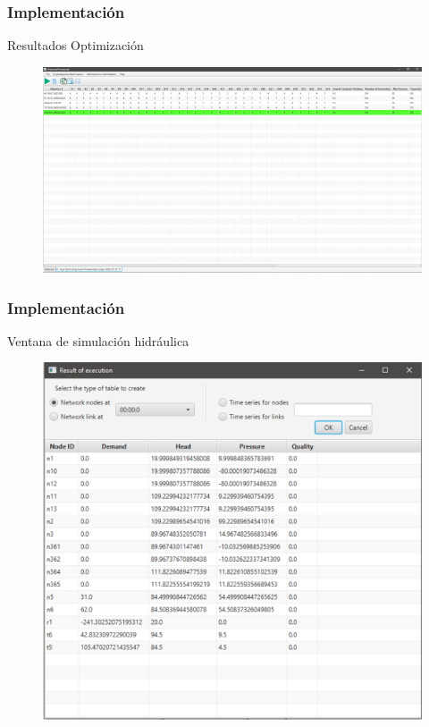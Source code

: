 \documentclass[9pt]{beamer}
\begin{document}
    \begin{frame}
        \frametitle{Implementación}
        Resultados Optimización                
        \begin{figure}
            \includegraphics[width=\textwidth]{assets/Interfaces/Resultados.png}
        \end{figure}
    \end{frame}

    \begin{frame}
        \frametitle{Implementación}
        Ventana de simulación hidráulica                 
        \begin{figure}
            \includegraphics[height=0.8\textheight]{assets/Interfaces/ResultadosSimulacion.png}
        \end{figure}
    \end{frame}
\end{document}
